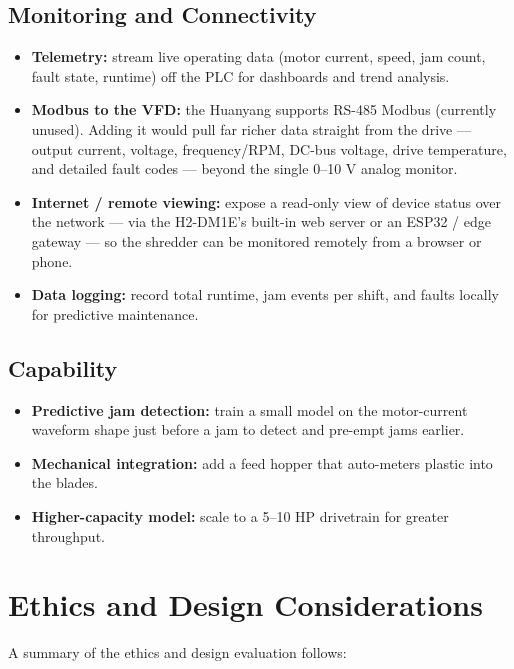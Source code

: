 \documentclass[hidelinks,12pt]{article}
\begin{document}
\subsection{Monitoring and Connectivity}
\begin{itemize}
    \item \textbf{Telemetry:} stream live operating data (motor current, speed, jam count, fault state, runtime) off the PLC for dashboards and trend analysis.
    \item \textbf{Modbus to the VFD:} the Huanyang supports RS-485 Modbus (currently unused). Adding it would pull far richer data straight from the drive --- output current, voltage, frequency/RPM, DC-bus voltage, drive temperature, and detailed fault codes --- beyond the single 0--10 V analog monitor.
    \item \textbf{Internet / remote viewing:} expose a read-only view of device status over the network --- via the H2-DM1E's built-in web server or an ESP32 / edge gateway --- so the shredder can be monitored remotely from a browser or phone.
    \item \textbf{Data logging:} record total runtime, jam events per shift, and faults locally for predictive maintenance.
\end{itemize}

\subsection{Capability}
\begin{itemize}
    \item \textbf{Predictive jam detection:} train a small model on the motor-current waveform shape just before a jam to detect and pre-empt jams earlier.
    \item \textbf{Mechanical integration:} add a feed hopper that auto-meters plastic into the blades.
    \item \textbf{Higher-capacity model:} scale to a 5--10 HP drivetrain for greater throughput.
\end{itemize}

\section{Ethics and Design Considerations}

A summary of the ethics and design evaluation follows:
\end{document}
